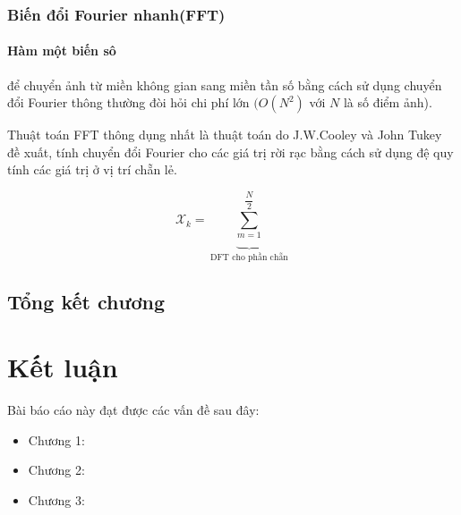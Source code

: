 \documentclass[12pt,a4paper]{report}
\numberwithin{equation}{section}
\theoremstyle{definition} %
\begin{document}
\subsection{Biến đổi Fourier nhanh(FFT)}
\subsubsection{Hàm một biến sô}
để chuyển ảnh từ miền không gian sang miền tần số bằng cách sử dụng chuyển đổi Fourier thông thường đòi hỏi chi phí lớn $(O(N^2)$ với $N$ là số điểm ảnh).

Thuật toán FFT thông dụng nhất là thuật toán do J.W.Cooley và John Tukey đề xuất, tính chuyển đổi Fourier cho các giá trị rời rạc bằng cách sử dụng đệ quy tính các giá trị ở vị trí chẵn lẻ. 


\begin{equation}
\mathcal{X}_k = \underbrace{\sum_{m=1}^{\dfrac{N}{2}}}_{ \text{DFT cho phần chẵn}}
\end{equation}
\section{Tổng kết chương}

	\chapter*{Kết luận}                         %
	\indent
	\thispagestyle{fancy}
	

Bài báo cáo này đạt được các vấn đề sau đây:
	
	\begin{itemize}
	\item Chương 1:
	

	
	\item Chương 2:

	
	\item Chương 3: 
	

	
	\end{itemize}
	
\end{document}
